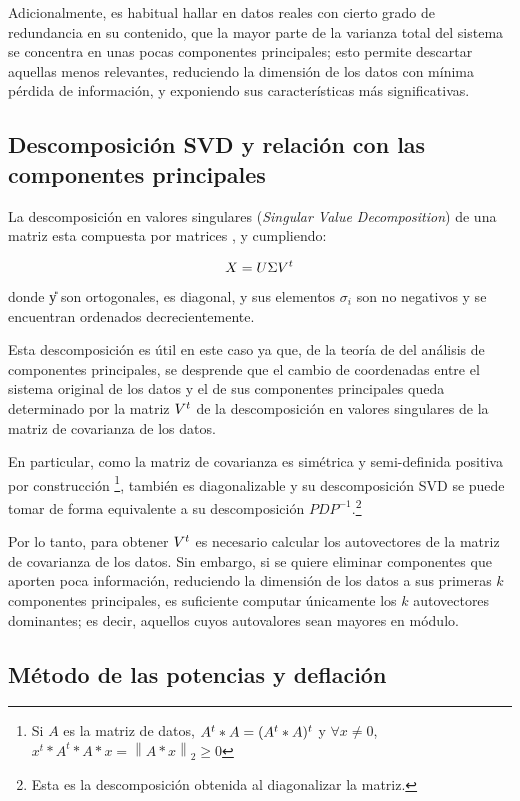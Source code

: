 Adicionalmente, es habitual hallar en datos reales con cierto grado de redundancia en su contenido, que la mayor parte de la varianza total del sistema se concentra en unas pocas componentes principales; esto permite descartar aquellas menos relevantes, reduciendo la dimensión de los datos con mínima pérdida de información, y exponiendo sus características más significativas.

\subsection{Descomposición SVD y relación con las componentes principales}

La descomposición en valores singulares (\emph{Singular Value Decomposition}) de una matriz \decMat{\X}{\M}{\N} esta compuesta por matrices \decMat{\U}{\M}{\M}, \decMat{\Sig}{\M}{\N} y \decMat{\V}{\N}{\N} cumpliendo:

$$X = U \Sigma V^{t}$$

donde \U y \V son ortogonales, \Sig es diagonal, y sus elementos $\sigma_i$ son no negativos y se encuentran ordenados decrecientemente.

Esta descomposición es útil en este caso ya que, de la teoría de del análisis de componentes principales, se desprende que el cambio de coordenadas entre el sistema original de los datos y el de sus componentes principales queda determinado por la matriz $V^{t}$ de la descomposición en valores singulares de la matriz de covarianza de los datos.

En particular, como la matriz de covarianza es simétrica y semi-definida positiva por construcción \footnote{Si $A$ es la matriz de datos, $A^{t} * A = (A^{t} * A)^{t}$ y $\forall x \neq 0$, $x^t * A^t * A * x = \left \| A*x \right \|_2 \geq 0$}, también es diagonalizable y su descomposición SVD se puede tomar de forma equivalente a su descomposición $PDP^{-1}$.\footnote{Esta es la descomposición obtenida al diagonalizar la matriz.}

Por lo tanto, para obtener $V^{t}$ es necesario calcular los autovectores de la matriz de covarianza de los datos. Sin embargo, si se quiere eliminar componentes que aporten poca información, reduciendo la dimensión de los datos a sus primeras $k$ componentes principales, es suficiente computar únicamente los $k$ autovectores dominantes; es decir, aquellos cuyos autovalores sean mayores en módulo.


\subsection{Método de las potencias y deflación}

